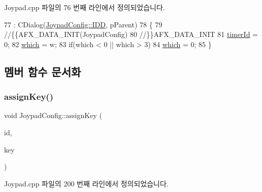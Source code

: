 Joypad.\+cpp 파일의 76 번째 라인에서 정의되었습니다.


\begin{DoxyCode}
77   : CDialog(\mbox{\hyperlink{class_joypad_config_a3de60b70a9e5b5a104211e300d388beaa3576d2df47b78d2eb08aaf607547efaf}{JoypadConfig::IDD}}, pParent)
78 \{
79   \textcolor{comment}{//\{\{AFX\_DATA\_INIT(JoypadConfig)}
80   \textcolor{comment}{//\}\}AFX\_DATA\_INIT}
81   \mbox{\hyperlink{class_joypad_config_ae2eb21b8f63e8cf86a5461e78901c3f5}{timerId}} = 0;
82   \mbox{\hyperlink{class_joypad_config_ad71f1ad36754d788de00eb4bb5630dda}{which}} = w;
83   \textcolor{keywordflow}{if}(which < 0 || which > 3)
84     \mbox{\hyperlink{class_joypad_config_ad71f1ad36754d788de00eb4bb5630dda}{which}} = 0;
85 \}
\end{DoxyCode}


\subsection{멤버 함수 문서화}
\mbox{\label{class_joypad_config_a6fe836465dc6d861d96691c03ad0a636}} 
\subsubsection{\texorpdfstring{assign\+Key()}{assignKey()}}
{\footnotesize\ttfamily void Joypad\+Config\+::assign\+Key (\begin{DoxyParamCaption}\item[{\mbox{\hyperlink{_util_8cpp_a0ef32aa8672df19503a49fab2d0c8071}{int}}}]{id,  }\item[{L\+O\+N\+G\+\_\+\+P\+TR}]{key }\end{DoxyParamCaption})}



Joypad.\+cpp 파일의 200 번째 라인에서 정의되었습니다.


